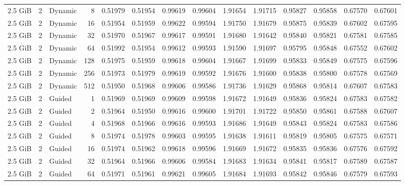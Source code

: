 \begin{table}[H]
\begin{adjustbox}{width=\textwidth, keepaspectratio}
\begin{tabular}{rrlrrrrrrrrrrr}
                    2.5 GiB & 2 & Dynamic & 8 & 0.51979 & 0.51954 & 0.99619 & 0.99604 & 1.91654 & 1.91715 & 0.95827 & 0.95858 & 0.67570 & 0.67601 \\
                    2.5 GiB & 2 & Dynamic & 16 & 0.51954 & 0.51959 & 0.99622 & 0.99594 & 1.91750 & 1.91679 & 0.95875 & 0.95839 & 0.67602 & 0.67595 \\
                    2.5 GiB & 2 & Dynamic & 32 & 0.51970 & 0.51967 & 0.99617 & 0.99591 & 1.91680 & 1.91642 & 0.95840 & 0.95821 & 0.67581 & 0.67585 \\
                    2.5 GiB & 2 & Dynamic & 64 & 0.51992 & 0.51954 & 0.99612 & 0.99593 & 1.91590 & 1.91697 & 0.95795 & 0.95848 & 0.67552 & 0.67602 \\
                    2.5 GiB & 2 & Dynamic & 128 & 0.51975 & 0.51959 & 0.99618 & 0.99604 & 1.91667 & 1.91699 & 0.95833 & 0.95849 & 0.67575 & 0.67596 \\
                    2.5 GiB & 2 & Dynamic & 256 & 0.51973 & 0.51979 & 0.99619 & 0.99592 & 1.91676 & 1.91600 & 0.95838 & 0.95800 & 0.67578 & 0.67569 \\
                    2.5 GiB & 2 & Dynamic & 512 & 0.51950 & 0.51968 & 0.99606 & 0.99586 & 1.91736 & 1.91629 & 0.95868 & 0.95814 & 0.67607 & 0.67583 \\
                    2.5 GiB & 2 & Guided & 1 & 0.51969 & 0.51969 & 0.99609 & 0.99598 & 1.91672 & 1.91649 & 0.95836 & 0.95824 & 0.67583 & 0.67582 \\
                    2.5 GiB & 2 & Guided & 2 & 0.51964 & 0.51950 & 0.99616 & 0.99600 & 1.91701 & 1.91722 & 0.95850 & 0.95861 & 0.67588 & 0.67607 \\
                    2.5 GiB & 2 & Guided & 4 & 0.51968 & 0.51966 & 0.99616 & 0.99593 & 1.91686 & 1.91649 & 0.95843 & 0.95824 & 0.67583 & 0.67586 \\
                    2.5 GiB & 2 & Guided & 8 & 0.51974 & 0.51978 & 0.99603 & 0.99595 & 1.91638 & 1.91611 & 0.95819 & 0.95805 & 0.67575 & 0.67571 \\
                    2.5 GiB & 2 & Guided & 16 & 0.51974 & 0.51962 & 0.99618 & 0.99596 & 1.91669 & 1.91672 & 0.95835 & 0.95836 & 0.67576 & 0.67592 \\
                    2.5 GiB & 2 & Guided & 32 & 0.51964 & 0.51966 & 0.99606 & 0.99584 & 1.91683 & 1.91634 & 0.95841 & 0.95817 & 0.67589 & 0.67587 \\
                    2.5 GiB & 2 & Guided & 64 & 0.51971 & 0.51961 & 0.99621 & 0.99605 & 1.91684 & 1.91693 & 0.95842 & 0.95846 & 0.67579 & 0.67593 \\

\end{tabular}
\end{adjustbox}
\end{table}
